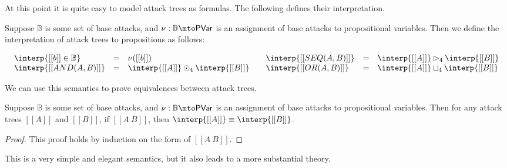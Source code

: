 At this point it is quite easy to model attack trees as formulas.  The
following defines their interpretation.
\begin{definition}
  \label{def:interp-aterms-quaternary}
  Suppose $\mathbb{B}$ is some set of base attacks, and $\nu :
  \mathbb{B} \mto \mathsf{PVar}$ is an assignment of base attacks to
  propositional variables.  Then we define the interpretation of
  attack trees to propositions as follows:
  \begin{center}
    \begin{math}
      \setlength{\arraycolsep}{5px}
      \begin{array}{lll}
        \begin{array}{lll}
          \interp{[[b]] \in \mathbb{B}} & = & \nu([[b]])\\
          \interp{[[AND(A, B)]]} & = & \interp{[[A]]} \odot_4 \interp{[[B]]}\\
        \end{array}
        &
        \begin{array}{lll}
          \interp{[[SEQ(A,B)]]} & = & \interp{[[A]]} \rhd_4 \interp{[[B]]}\\
          \interp{[[OR(A,B)]]} & = & \interp{[[A]]} \sqcup_4 \interp{[[B]]}\\
        \end{array}
      \end{array}
    \end{math}
  \end{center}
\end{definition}
We can use this semantics to prove equivalences between attack trees.
\begin{lemma}
  \label{lemma:equivalence_of_attack_trees}
  Suppose $\mathbb{B}$ is some set of base attacks, and $\nu :
  \mathbb{B} \mto \mathsf{PVar}$ is an assignment of base attacks to
  propositional variables.  Then for any attack trees $[[A]]$ and
  $[[B]]$, if $[[A ~ B]]$, then $\interp{[[A]]} \equiv
  \interp{[[B]]}$.
\end{lemma}
\begin{proof}
  This proof holds by induction on the form of $[[A ~ B]]$.
\end{proof}
This is a very simple and elegant semantics, but it also leads to a
more substantial theory.

